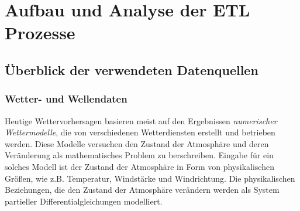 
\chapter{Aufbau und Analyse der ETL Prozesse}
\section{Überblick der verwendeten Datenquellen}

\subsection{Wetter- und Wellendaten}

Heutige Wettervorhersagen basieren meist auf den Ergebnissen
\textit{numerischer Wettermodelle}, die von verschiedenen
Wetterdiensten erstellt und betrieben werden. Diese Modelle versuchen
den Zustand der Atmosphäre und deren Veränderung als mathematisches
Problem zu berschreiben. Eingabe für ein solches Modell ist der
Zustand der Atmosphäre in Form von physikalischen Größen, wie
z.B. Temperatur, Windstärke und Windrichtung. Die physikalischen
Beziehungen, die den Zustand der Atmosphäre verändern werden als
System partieller Differentialgleichungen modelliert.


















